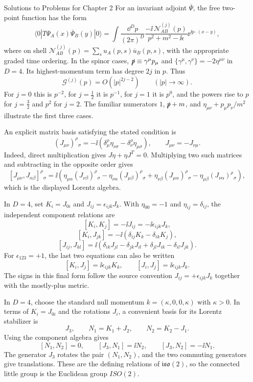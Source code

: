 \begin{bankssolutions}{Solutions to Problems for Chapter 2}
For an invariant adjoint $\overline\Psi$, the free two-point function has the form
\[
  \langle0|T\Psi_{A}(x)\overline\Psi_{B}(y)|0\rangle
  =\int\frac{\dd^{D}p}{(2\pi)^{D}}
  \frac{-\ii\,\mathcal N^{(j)}_{AB}(p)}{p^{2}+m^{2}-\ii\epsilon}
  \ee^{\ii p\mathbin{\cdot}(x-y)},
\]
where on shell $\mathcal N^{(j)}_{AB}(p)=\sum_{s}u_{A}(p,s)\overline u_{B}(p,s)$, with the appropriate graded time ordering. In the spinor cases, $\slashed p\equiv\gamma^{\mu}p_{\mu}$ and $\{\gamma^{\mu},\gamma^{\nu}\}=-2\eta^{\mu\nu}$ in $D=4$. Its highest-momentum term has degree $2j$ in $p$. Thus
\[
  \mathcal G^{(j)}(p)=O(|p|^{2j-2})\qquad(|p|\to\infty).
\]
For $j=0$ this is $p^{-2}$, for $j=\tfrac12$ it is $p^{-1}$, for $j=1$ it is $p^{0}$, and the powers rise to $p$ for $j=\tfrac32$ and $p^{2}$ for $j=2$. The familiar numerators $1$, $\slashed p+m$, and $\eta_{\mu\nu}+p_{\mu}p_{\nu}/m^{2}$ illustrate the first three cases.

An explicit matrix basis satisfying the stated condition is
\[
  (J_{\mu\nu})^{\rho}{}_{\sigma}
  =-\ii\left(\delta_{\mu}^{\rho}\eta_{\nu\sigma}
  -\delta_{\nu}^{\rho}\eta_{\mu\sigma}\right),
  \qquad J_{\mu\nu}=-J_{\nu\mu}.
\]
Indeed, direct multiplication gives $J\eta+\eta J^{T}=0$. Multiplying two such matrices and subtracting in the opposite order gives
\[
  [J_{\mu\nu},J_{\alpha\beta}]^{\rho}{}_{\sigma}
  =\ii\left(\eta_{\mu\alpha}(J_{\nu\beta})^{\rho}{}_{\sigma}
  -\eta_{\nu\alpha}(J_{\mu\beta})^{\rho}{}_{\sigma}
  +\eta_{\nu\beta}(J_{\mu\alpha})^{\rho}{}_{\sigma}
  -\eta_{\mu\beta}(J_{\nu\alpha})^{\rho}{}_{\sigma}\right),
\]
which is the displayed Lorentz algebra.

In $D=4$, set $K_{i}=J_{0i}$ and $J_{ij}=\epsilon_{ijk}J_{k}$. With $\eta_{00}=-1$ and $\eta_{ij}=\delta_{ij}$, the independent component relations are
\[
  [K_{i},K_{j}]=-\ii J_{ij}=-\ii\epsilon_{ijk}J_{k},
\]
\[
  [K_{i},J_{jk}]=-\ii(\delta_{ij}K_{k}-\delta_{ik}K_{j}),
\]
\[
  [J_{ij},J_{kl}]=\ii\left(\delta_{ik}J_{jl}-\delta_{jk}J_{il}
  +\delta_{jl}J_{ik}-\delta_{il}J_{jk}\right).
\]
For $\epsilon_{123}=+1$, the last two equations can also be written
\[
  [K_{i},J_{j}]=\ii\epsilon_{ijk}K_{k},
  \qquad
  [J_{i},J_{j}]=\ii\epsilon_{ijk}J_{k}.
\]
The signs in this final form follow the source convention $J_{ij}=+\epsilon_{ijk}J_{k}$ together with the mostly-plus metric.

In $D=4$, choose the standard null momentum $k=(\kappa,0,0,\kappa)$ with $\kappa>0$. In terms of $K_{i}=J_{0i}$ and the rotations $J_{i}$, a convenient basis for its Lorentz stabilizer is
\[
  J_{3},\qquad N_{1}=K_{1}+J_{2},\qquad N_{2}=K_{2}-J_{1}.
\]
Using the component algebra gives
\[
  [N_{1},N_{2}]=0,
  \qquad [J_{3},N_{1}]=\ii N_{2},
  \qquad [J_{3},N_{2}]=-\ii N_{1}.
\]
The generator $J_{3}$ rotates the pair $(N_{1},N_{2})$, and the two commuting generators give translations. These are the defining relations of $\mathfrak{iso}(2)$, so the connected little group is the Euclidean group $ISO(2)$.


\end{bankssolutions}
